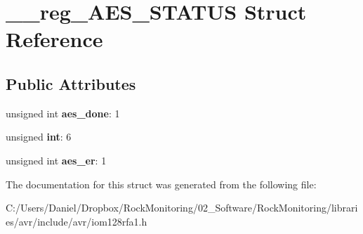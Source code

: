 \hypertarget{struct____reg___a_e_s___s_t_a_t_u_s}{}\section{\+\_\+\+\_\+reg\+\_\+\+A\+E\+S\+\_\+\+S\+T\+A\+T\+US Struct Reference}
\label{struct____reg___a_e_s___s_t_a_t_u_s}
\subsection*{Public Attributes}
\begin{DoxyCompactItemize}
\item 
unsigned int {\bfseries aes\+\_\+done}\+: 1\hypertarget{struct____reg___a_e_s___s_t_a_t_u_s_a2de12acb29be6426d0b47bf34d2f416f}{}\label{struct____reg___a_e_s___s_t_a_t_u_s_a2de12acb29be6426d0b47bf34d2f416f}

\item 
unsigned {\bfseries int}\+: 6\hypertarget{struct____reg___a_e_s___s_t_a_t_u_s_a661db22905f5fe1c7916240127c56d9d}{}\label{struct____reg___a_e_s___s_t_a_t_u_s_a661db22905f5fe1c7916240127c56d9d}

\item 
unsigned int {\bfseries aes\+\_\+er}\+: 1\hypertarget{struct____reg___a_e_s___s_t_a_t_u_s_a43be7514b0a99e36399588c195e0c80b}{}\label{struct____reg___a_e_s___s_t_a_t_u_s_a43be7514b0a99e36399588c195e0c80b}

\end{DoxyCompactItemize}


The documentation for this struct was generated from the following file\+:\begin{DoxyCompactItemize}
\item 
C\+:/\+Users/\+Daniel/\+Dropbox/\+Rock\+Monitoring/02\+\_\+\+Software/\+Rock\+Monitoring/libraries/avr/include/avr/iom128rfa1.\+h\end{DoxyCompactItemize}
